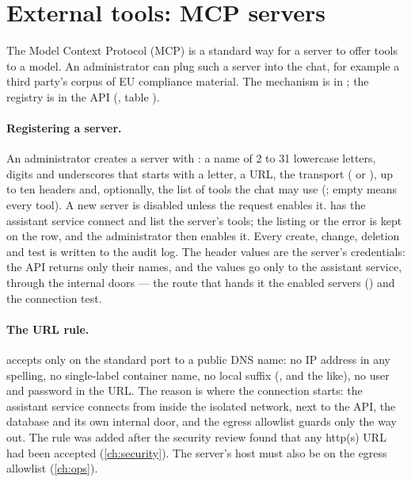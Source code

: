 \section{External tools: MCP servers}\label{sec:chat:mcp}

The Model Context Protocol (MCP) is a standard way for a server to offer tools to a model. An
administrator can plug such a server into the chat, for example a third party's corpus of EU
compliance material. The mechanism is in ; the registry is in the API
(, table ).

\paragraph{Registering a server.} An administrator creates a server with
: a name of 2 to 31 lowercase letters, digits and underscores
that starts with a letter, a URL, the transport ( or ), up to ten headers
and, optionally, the list of tools the chat may use (; empty means every
tool). A new server is disabled unless the request enables it.  has the assistant service connect and list
the server's tools; the listing or the error is kept on the row, and the administrator then
enables it. Every create, change, deletion and test is written to the audit log. The header
values are the server's credentials: the API returns only their names, and the values go only
to the assistant service, through the internal doors --- the route that hands it the enabled
servers () and the connection test.

\paragraph{The URL rule.}  accepts only  on the standard port to
a public DNS name: no IP address in any spelling, no single-label container name, no local
suffix (,  and the like), no user and password in the URL. The
reason is where the connection starts: the assistant service connects from inside the isolated
network, next to the API, the database and its own internal door, and the egress allowlist
guards only the way out. The rule was added after the security review found that any http(s) URL had
been accepted (\cref{ch:security}). The server's host must also be on the egress allowlist
(\cref{ch:ops}).

